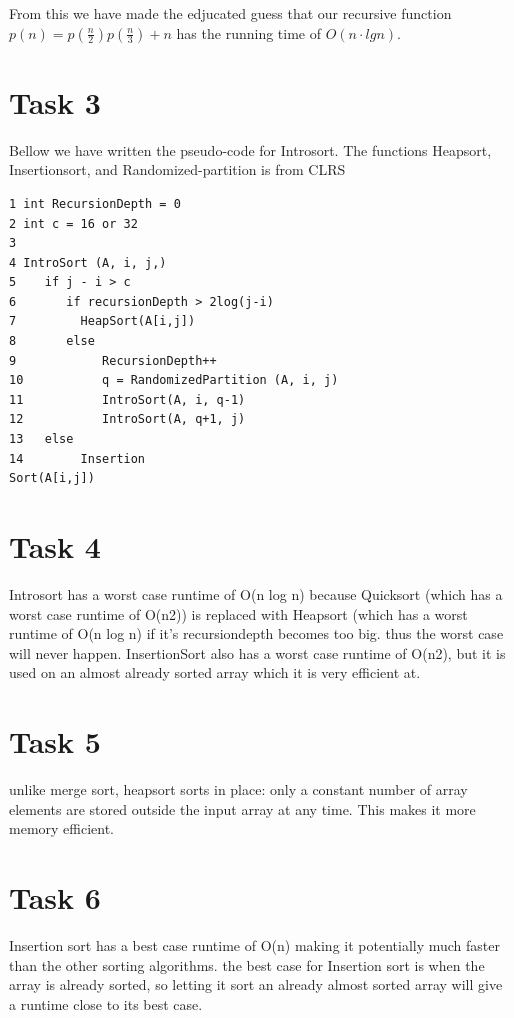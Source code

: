 \documentclass[12pt]{article}
\begin{document}
From this we have made the edjucated guess that our recursive function $p(n) = p(\frac{n}{2}) p(\frac{n}{3}) + n $ has the running time of $O(n \cdot lgn)$.
\newpage
\section{Task 3}
Bellow we have written the pseudo-code for Introsort. The functions Heapsort, Insertionsort, and Randomized-partition is from CLRS\\

\begin{verbatim}
1 int RecursionDepth = 0
2 int c = 16 or 32
3	
4 IntroSort (A, i, j,)
5    if j - i > c 
6       if recursionDepth > 2log(j-i)
7         HeapSort(A[i,j])
8       else 
9            RecursionDepth++
10           q = RandomizedPartition (A, i, j)
11           IntroSort(A, i, q-1)
12           IntroSort(A, q+1, j)
13   else 
14        Insertion
Sort(A[i,j])
\end{verbatim}
\section{Task 4}
Introsort has a worst case runtime of O(n log n) because Quicksort\cite{introduction-algorithms} (which has a worst case runtime of O(n2)) is replaced with Heapsort\cite{introduction-algorithms} (which has a worst runtime of O(n log n) if it's recursiondepth becomes too big. thus the worst case will never happen. 
InsertionSort\cite{introduction-algorithms} also has a worst case runtime of O(n2), but it is used on an almost already sorted array which it is very efficient at.

\section{Task 5}
unlike merge sort, heapsort sorts in place: only a constant number of array elements are stored outside the input array at any time. This makes it more memory efficient. 

\section{Task 6}
Insertion sort has a best case runtime of O(n) making it potentially much faster than the other sorting algorithms. the best case for Insertion sort is when the array is already sorted, so letting it sort an already almost sorted array will give a runtime close to its best case.



\end{document}
